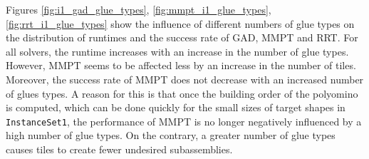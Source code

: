 Figures \ref{fig:i1_gad_glue_types}, \ref{fig:mmpt_i1_glue_types}, \ref{fig:rrt_i1_glue_types} show the influence of different numbers of glue types on the distribution of runtimes and the success rate of GAD, MMPT and RRT. For all solvers, the runtime increases with an increase in the number of glue types. However, MMPT seems to be affected less by an increase in the number of tiles. Moreover, the success rate of MMPT does not decrease with an increased number of glues types. A reason for this is that once the building order of the polyomino is computed, which can be done quickly for the small sizes of target shapes in \texttt{InstanceSet1}, the performance of MMPT is no longer negatively influenced by a high number of glue types. On the contrary, a greater number of glue types causes tiles to create fewer undesired subassemblies.

